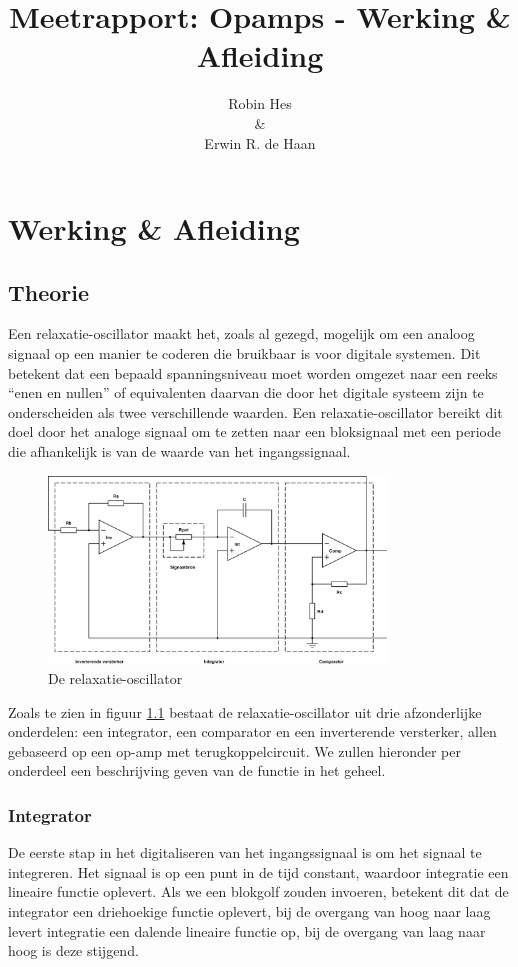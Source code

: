 \documentclass{report}
\title{Meetrapport: Opamps - Werking \& Afleiding}
\author{Robin Hes\\\&\\Erwin R. de Haan}
\begin{document}
\chapter{Werking \& Afleiding}

\section{Theorie}
Een relaxatie-oscillator maakt het, zoals al gezegd, mogelijk om een analoog signaal op een manier te coderen die bruikbaar is voor digitale systemen. Dit betekent dat een bepaald spanningsniveau moet worden omgezet naar een reeks ``enen en nullen'' of equivalenten daarvan die door het digitale systeem zijn te onderscheiden als twee verschillende waarden. Een relaxatie-oscillator bereikt dit doel door het analoge signaal om te zetten naar een bloksignaal met een periode die afhankelijk is van de waarde van het ingangssignaal.

\begin{figure}[H]
	\centering
	\includegraphics[width=0.8\textwidth]{relaxatie-oscillator.png}
	\caption{De relaxatie-oscillator}
	\label{fig:rel-os}
\end{figure}

Zoals te zien in figuur \ref{fig:rel-os} bestaat de relaxatie-oscillator uit drie afzonderlijke onderdelen: een integrator, een comparator en een inverterende versterker, allen gebaseerd op een op-amp met terugkoppelcircuit. We zullen hieronder per onderdeel een beschrijving geven van de functie in het geheel.

\subsection{Integrator}

De eerste stap in het digitaliseren van het ingangssignaal is om het signaal te integreren. Het signaal is op een punt in de tijd constant, waardoor integratie een lineaire functie oplevert. Als we een blokgolf zouden invoeren, betekent dit dat de integrator een driehoekige functie oplevert, bij de overgang van hoog naar laag levert integratie een dalende lineaire functie op, bij de overgang van laag naar hoog is deze stijgend.\\
\end{document}

